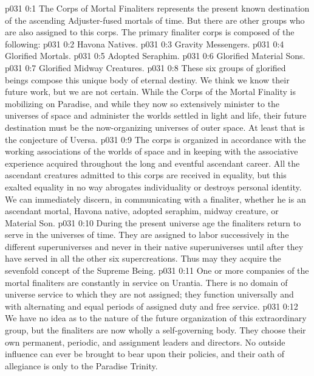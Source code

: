 \author{Divine Counselor and One without Name and Number}
\vs p031 0:1 The Corps of Mortal Finaliters represents the present known destination of the ascending Adjuster\hyp{}fused mortals of time. But there are other groups who are also assigned to this corps. The primary finaliter corps is composed of the following:
\pc \vs p031 0:2 \bibnobreakspace Havona Natives.
\vs p031 0:3 \bibnobreakspace Gravity Messengers.
\vs p031 0:4 \bibnobreakspace Glorified Mortals.
\vs p031 0:5 \bibnobreakspace Adopted Seraphim.
\vs p031 0:6 \bibnobreakspace Glorified Material Sons.
\vs p031 0:7 \bibnobreakspace Glorified Midway Creatures.
\pc \vs p031 0:8 These six groups of glorified beings compose this unique body of eternal destiny. We think we know their future work, but we are not certain. While the Corps of the Mortal Finality is mobilizing on Paradise, and while they now so extensively minister to the universes of space and administer the worlds settled in light and life, their future destination must be the now\hyp{}organizing universes of outer space. At least that is the conjecture of Uversa.
\vs p031 0:9 The corps is organized in accordance with the working associations of the worlds of space and in keeping with the associative experience acquired throughout the long and eventful ascendant career. All the ascendant creatures admitted to this corps are received in equality, but this exalted equality in no way abrogates individuality or destroys personal identity. We can immediately discern, in communicating with a finaliter, whether he is an ascendant mortal, Havona native, adopted seraphim, midway creature, or Material Son.
\vs p031 0:10 During the present universe age the finaliters return to serve in the universes of time. They are assigned to labor successively in the different superuniverses and never in their native superuniverses until after they have served in all the other six supercreations. Thus may they acquire the sevenfold concept of the Supreme Being.\plusone
\vs p031 0:11 One or more companies of the mortal finaliters are constantly in service on Urantia. There is no domain of universe service to which they are not assigned; they function universally and with alternating and equal periods of assigned duty and free service.
\vs p031 0:12 We have no idea as to the nature of the future organization of this extraordinary group, but the finaliters are now wholly a self\hyp{}governing body. They choose their own permanent, periodic, and assignment leaders and directors. No outside influence can ever be brought to bear upon their policies, and their oath of allegiance is only to the Paradise Trinity.
